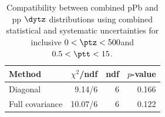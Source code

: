 \begin{table}[htp!]
\centering
\begin{tabular}{|l|r|r|r|}
\hline
Method & $\chi^2$/ndf & ndf & $p$-value \\
\hline
Diagonal & 9.14/6 & 6 & 0.166 \\
Full covariance & 10.07/6 & 6 & 0.122 \\
\hline
\end{tabular}
\caption{Compatibility between combined pPb and pp $\dytz$ distributions using combined statistical and systematic uncertainties for inclusive $0 < \ptz < 500$\GeV and $0.5 < \ptt < 15$\GeV.}
\label{table:chisq_deta}
\end{table}
